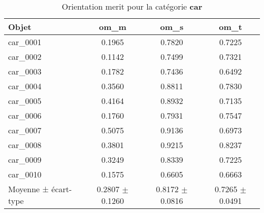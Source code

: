 \documentclass[a4paper,11pt]{article}
\begin{document}
\begin{table}[h!]
\centering
\caption{Orientation merit pour la catégorie \textbf{car}}
\begin{tabular}{lccc}
\toprule
Objet & om\_m & om\_s & om\_t \\
\midrule
car\_0001 & 0.1965 & 0.7820 & 0.7225 \\
car\_0002 & 0.1142 & 0.7499 & 0.7321 \\
car\_0003 & 0.1782 & 0.7436 & 0.6492 \\
car\_0004 & 0.3560 & 0.8811 & 0.7830 \\
car\_0005 & 0.4164 & 0.8932 & 0.7135 \\
car\_0006 & 0.1760 & 0.7931 & 0.7547 \\
car\_0007 & 0.5075 & 0.9136 & 0.6973 \\
car\_0008 & 0.3801 & 0.9215 & 0.8237 \\
car\_0009 & 0.3249 & 0.8339 & 0.7225 \\
car\_0010 & 0.1575 & 0.6605 & 0.6663 \\
\midrule
Moyenne ± écart-type & 0.2807 $\pm$ 0.1260 & 0.8172 $\pm$ 0.0816 & 0.7265 $\pm$ 0.0491 \\
\bottomrule
\end{tabular}
\end{table}
\end{document}
